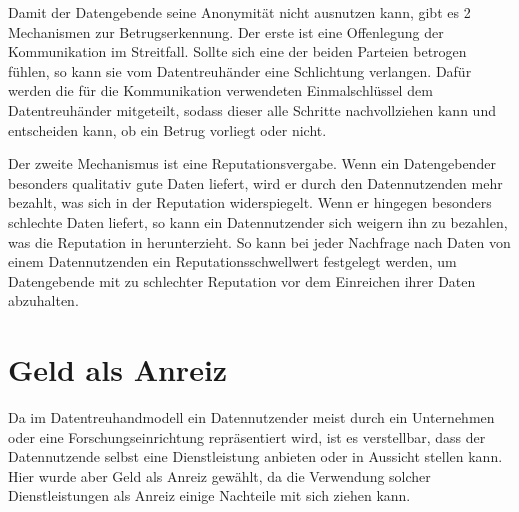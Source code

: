 \documentclass[11pt,a4paper]{scrreprt}
\begin{document}
Damit der Datengebende seine Anonymität nicht ausnutzen kann, gibt es 2 Mechanismen zur Betrugserkennung. Der erste ist eine Offenlegung der Kommunikation im Streitfall. Sollte sich eine der beiden Parteien betrogen fühlen, so kann sie vom Datentreuhänder eine Schlichtung verlangen. Dafür werden die für die Kommunikation verwendeten Einmalschlüssel dem Datentreuhänder mitgeteilt, sodass dieser alle Schritte nachvollziehen kann und entscheiden kann, ob ein Betrug vorliegt oder nicht. 

Der zweite Mechanismus ist eine Reputationsvergabe. Wenn ein Datengebender besonders qualitativ gute Daten liefert, wird er durch den Datennutzenden mehr bezahlt, was sich in der Reputation widerspiegelt. Wenn er hingegen besonders schlechte Daten liefert, so kann ein Datennutzender sich weigern ihn zu bezahlen, was die Reputation in herunterzieht. So kann bei jeder Nachfrage nach Daten von einem Datennutzenden ein Reputationsschwellwert festgelegt werden, um Datengebende mit zu schlechter Reputation vor dem Einreichen ihrer Daten abzuhalten. 

\section{Geld als Anreiz}
Da im Datentreuhandmodell ein Datennutzender meist durch ein Unternehmen oder eine Forschungseinrichtung repräsentiert wird, ist es verstellbar, dass der Datennutzende selbst eine Dienstleistung anbieten oder in Aussicht stellen kann. Hier wurde aber Geld als Anreiz gewählt, da die Verwendung solcher Dienstleistungen als Anreiz einige Nachteile mit sich ziehen kann.
\end{document}
